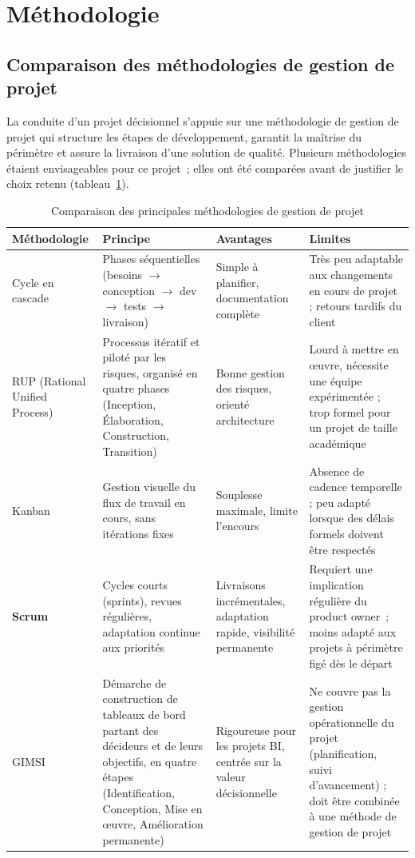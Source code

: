 \section*{Méthodologie}

\subsection*{Comparaison des méthodologies de gestion de projet}

La conduite d'un projet décisionnel s'appuie sur une méthodologie de gestion de projet qui structure les étapes de développement, garantit la maîtrise du périmètre et assure la livraison d'une solution de qualité. Plusieurs méthodologies étaient envisageables pour ce projet~; elles ont été comparées avant de justifier le choix retenu (tableau~\ref{tab:methodo_comparaison}).

\begin{table}[H]
\centering
\caption{Comparaison des principales méthodologies de gestion de projet}
\label{tab:methodo_comparaison}
\begin{tabular}{p{2.3cm}p{3.5cm}p{3.5cm}p{3.5cm}}
\toprule
\textbf{Méthodologie} & \textbf{Principe} & \textbf{Avantages} & \textbf{Limites} \\
\midrule
Cycle en cascade & Phases séquentielles (besoins $\rightarrow$ conception $\rightarrow$ dev $\rightarrow$ tests $\rightarrow$ livraison) & Simple à planifier, documentation complète & Très peu adaptable aux changements en cours de projet ; retours tardifs du client \\
\midrule
RUP (Rational Unified Process) & Processus itératif et piloté par les risques, organisé en quatre phases (Inception, Élaboration, Construction, Transition) & Bonne gestion des risques, orienté architecture & Lourd à mettre en œuvre, nécessite une équipe expérimentée ; trop formel pour un projet de taille académique \\
\midrule
Kanban & Gestion visuelle du flux de travail en cours, sans itérations fixes & Souplesse maximale, limite l'encours & Absence de cadence temporelle ; peu adapté lorsque des délais formels doivent être respectés \\
\midrule
\textbf{Scrum} & Cycles courts (sprints), revues régulières, adaptation continue aux priorités & Livraisons incrémentales, adaptation rapide, visibilité permanente & Requiert une implication régulière du product owner~; moins adapté aux projets à périmètre figé dès le départ \\
\midrule
GIMSI & Démarche de construction de tableaux de bord partant des décideurs et de leurs objectifs, en quatre étapes (Identification, Conception, Mise en œuvre, Amélioration permanente) & Rigoureuse pour les projets BI, centrée sur la valeur décisionnelle & Ne couvre pas la gestion opérationnelle du projet (planification, suivi d'avancement) ; doit être combinée à une méthode de gestion de projet \\
\bottomrule
\end{tabular}
\end{table}

